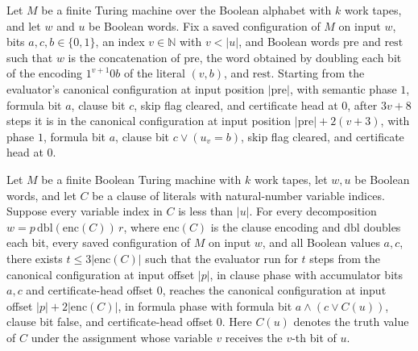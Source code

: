 \begin{lemma}
\label{Complexity.satEval_literal}
\leanok
{}
Let $M$ be a finite Turing machine over the Boolean alphabet with $k$ work tapes, and
let $w$ and $u$ be Boolean words. Fix a saved configuration of $M$ on input $w$, bits
$a,c,b\in\{0,1\}$, an index $v\in\mathbb{N}$ with $v<|u|$, and Boolean words
$\mathrm{pre}$ and $\mathrm{rest}$ such that $w$ is the concatenation of $\mathrm{pre}$,
the word obtained by doubling each bit of the encoding $1^{v+1}0b$ of the literal
$(v,b)$, and $\mathrm{rest}$. Starting from the evaluator's canonical configuration at
input position $|\mathrm{pre}|$, with semantic phase $1$, formula bit $a$, clause bit
$c$, skip flag cleared, and certificate head at $0$, after $3v+8$ steps it is in the
canonical configuration at input position $|\mathrm{pre}|+2(v+3)$, with phase $1$,
formula bit $a$, clause bit $c\vee(u_v=b)$, skip flag cleared, and certificate head at
$0$.
\end{lemma}

\begin{lemma}
\label{Complexity.satEval_clause}
\leanok
{}
Let $M$ be a finite Boolean Turing machine with $k$ work tapes, let $w,u$ be Boolean
words, and let $C$ be a clause of literals with natural-number variable indices. Suppose
every variable index in $C$ is less than $|u|$. For every decomposition
$w=p\,\mathrm{dbl}(\mathrm{enc}(C))\,r$, where $\mathrm{enc}(C)$ is the clause encoding
and $\mathrm{dbl}$ doubles each bit, every saved configuration of $M$ on input $w$, and
all Boolean values $a,c$, there exists $t\le 3|\mathrm{enc}(C)|$ such that the evaluator
run for $t$ steps from the canonical configuration at input offset $|p|$, in clause
phase with accumulator bits $a,c$ and certificate-head offset $0$, reaches the canonical
configuration at input offset $|p|+2|\mathrm{enc}(C)|$, in formula phase with formula
bit $a\wedge(c\vee C(u))$, clause bit false, and certificate-head offset $0$. Here
$C(u)$ denotes the truth value of $C$ under the assignment whose variable $v$ receives
the $v$-th bit of $u$.
\end{lemma}

